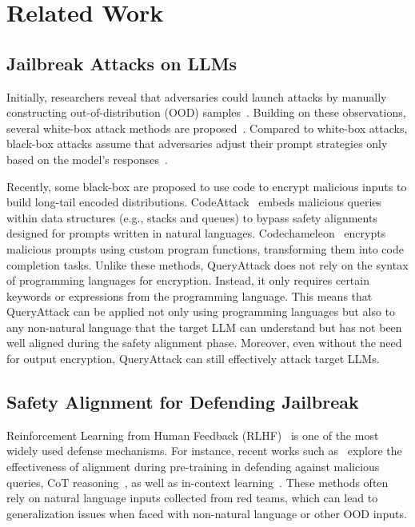 \section{Related Work}
\label{sec:related work}

\subsection{Jailbreak Attacks on LLMs}
Initially, researchers reveal that adversaries could launch attacks by manually constructing out-of-distribution (OOD) samples~\citep{DBLP:conf/emnlp/LiGFXHMS23, DBLP:conf/ccs/ShenC0SZ24}.
Building on these observations, several white-box attack methods are proposed~\citep{ARCA, DBLP:conf/icml/JonesDRS23, gao2024denial}. 
Compared to white-box attacks, black-box attacks assume that adversaries   adjust their prompt strategies only based on the model's responses~\citep{PsySafe, DBLP:journals/corr/abs-2311-03348, DBLP:conf/iclr/LiuXCX24, DBLP:journals/corr/abs-2410-10700, cipherchat, Multilingual}. 

Recently, some black-box are proposed to use code to encrypt malicious inputs to build long-tail encoded distributions. 
CodeAttack~\citep{codeattack} embeds malicious queries within data structures (e.g., stacks and queues) to bypass safety alignments designed for prompts written in natural languages. 
Codechameleon~\citep{codechameleon} encrypts malicious prompts using custom program functions, transforming them into code completion tasks.
Unlike these methods, QueryAttack does not rely on the syntax of programming languages for encryption. Instead, it only requires certain keywords or expressions from the programming language. This means that QueryAttack can be applied not only using programming languages but also to any non-natural language that the target LLM can understand but has not been well aligned during the safety alignment phase. Moreover, even without the need for output encryption, QueryAttack can still effectively attack target LLMs.

\subsection{Safety Alignment for Defending Jailbreak}
Reinforcement Learning from Human Feedback (RLHF)~\citep{RLHF} is one of the most widely used defense mechanisms. For instance, recent works such as~\citep{DBLP:conf/emnlp/MehrabiGDHGZCG024,Self-Alignment} explore the effectiveness of alignment during pre-training in defending against malicious queries, CoT reasoning~\citep{o1}, as well as in-context learning~\citep{DBLP:journals/corr/abs-2310-06387, DBLP:conf/acl/RenG0LZQL24}.  
These methods often rely on natural language inputs collected from red teams, which can lead to generalization issues when faced with non-natural language or other OOD inputs. 

